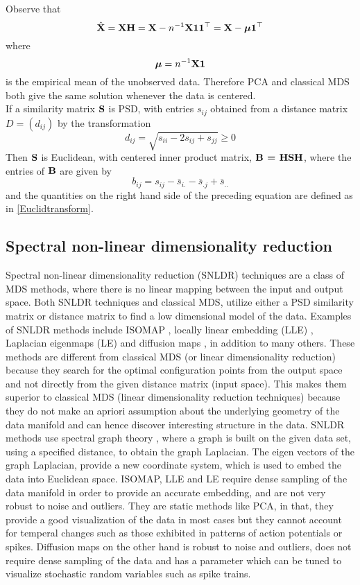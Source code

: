 Observe that 
\[ \hat{\textbf{X}} = \textbf{X}\textbf{H} = \textbf{X} - n^{-1} \textbf{X}\textbf{1}\textbf{1}^{\top} = \textbf{X} - \bm{\mu}\textbf{1}^{\top}
\]
where 
\[
\bm{\mu} = n^{-1} \textbf{X1}
\]
is the empirical mean of the unobserved data. Therefore PCA and classical MDS both give the same solution whenever the data is centered.\\

If a similarity matrix $\textbf{S}$ is PSD, with entries 
$s_{ij}$ obtained from a distance matrix $D = (d_{ij})$ by the transformation
\[ 
d_{ij} = \sqrt{s_{ii} - 2s_{ij} + s_{jj}} \geq 0
\]
Then $\textbf{S}$ is Euclidean, with centered inner product matrix, $\textbf{B = HSH}$, where the entries of $\textbf{B}$ are given by 
\[ 
b_{ij} = s_{ij} - \bar{s}_{i.} - \bar{s}_{.j} + \bar{s}_{..}
\]
and the quantities on the right hand side of the preceding equation are defined as in \eqref{Euclidtransform}.

\subsection{Spectral non-linear dimensionality reduction}
Spectral non-linear dimensionality reduction (SNLDR) techniques are a 
class of MDS methods, where there is no linear mapping between the 
input and output space. Both SNLDR techniques and classical MDS, utilize
either a PSD similarity matrix or distance matrix to find a low dimensional
model of the data. Examples of SNLDR methods include ISOMAP \cite{TenenbaumJB2000Aggf}, locally linear embedding (LLE)  \cite{roweis2000nonlinear}, Laplacian eigenmaps (LE) \cite{belkin2003laplacian}
and diffusion maps \cite{belkin2003laplacian}, in addition to many others.
These methods are different from classical MDS (or linear dimensionality reduction) because they search for the optimal configuration points from the output space and not directly from the given distance matrix (input space). This makes them
superior to classical MDS (linear dimensionality reduction techniques) because they do not make an apriori assumption
about the underlying geometry of the data manifold and can hence discover 
interesting structure in the data.
SNLDR methods use spectral graph theory \cite{Luxburg2007}, where a graph is built on the given data set, using a specified distance, to obtain the graph Laplacian. The eigen vectors of the graph Laplacian, provide a new coordinate system, which is used to embed the data into Euclidean space.
ISOMAP, LLE and LE require dense sampling of the data manifold in order to 
provide an accurate embedding, and are not very robust to noise and outliers.
They are static methods like PCA, in that, they provide a good visualization of the data in most cases but they cannot account for temperal changes such as those exhibited in patterns of action potentials or spikes. Diffusion  maps on the other hand is robust to noise and outliers, does not require dense sampling of the data and has a parameter which can be tuned to visualize stochastic random variables such as spike trains.\\


